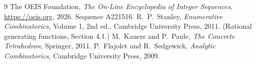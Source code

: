 \documentclass[11pt,a4paper]{article}
\theoremstyle{plain}
\theoremstyle{definition}
\begin{document}
\begin{thebibliography}{9}
 The OEIS Foundation, \emph{The On-Line Encyclopedia of Integer
Sequences}, \url{https://oeis.org}, 2026. Sequence A221516.
 R.~P.~Stanley, \emph{Enumerative Combinatorics}, Volume 1, 2nd ed.,
Cambridge University Press, 2011. (Rational generating functions, Section 4.1.)
 M.~Kauers and P.~Paule, \emph{The Concrete Tetrahedron}, Springer, 2011.
 P.~Flajolet and R.~Sedgewick, \emph{Analytic Combinatorics}, Cambridge
University Press, 2009.
\end{thebibliography}
\end{document}

